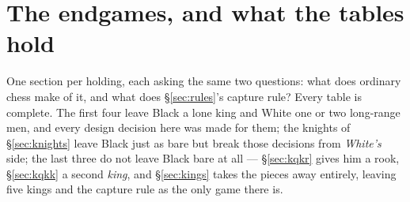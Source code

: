 \documentclass[10pt]{article}
\begin{document}
\medskip
{}

\setcounter{tocdepth}{2}
\medskip
\tableofcontents

\section{The endgames, and what the tables hold}\label{sec:endgames}

One section per holding, each asking the same two questions: what does ordinary
chess make of it, and what does \S\ref{sec:rules}'s capture rule? Every table
is complete. The first four leave Black a lone king and White one or two
long-range men, and every design decision here was made for them; the knights
of \S\ref{sec:knights} leave Black just as bare but break those decisions from
\emph{White's} side; the last three do not leave Black bare at all ---
\S\ref{sec:kqkr} gives him a rook, \S\ref{sec:kqkk} a second \emph{king}, and
\S\ref{sec:kings} takes the pieces away entirely, leaving five kings and the
capture rule as the only game there is.
\end{document}

